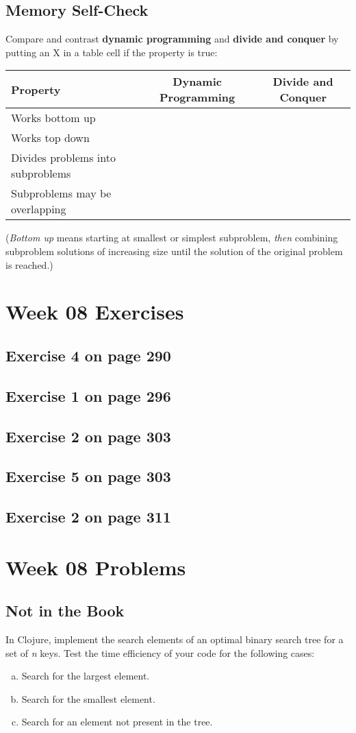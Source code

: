 \documentclass[12pt]{amsart}
\begin{document}
\subsection{Memory Self-Check}
Compare and contrast \textbf{dynamic programming} and \textbf{divide and conquer} by putting an X in a table cell if the property is true:
 
 \begin{tabular}{|l|c|c|}
 \hline
 Property&Dynamic Programming& Divide and Conquer\\
 \hline
 Works bottom up&&\\
 \hline
 Works top down&&\\
 \hline
 Divides problems into subproblems&&\\
 \hline
 Subproblems may be overlapping&&\\
 \hline
 \end{tabular}
(\textit{Bottom up} means starting at smallest or simplest subproblem, \textit{then} combining subproblem solutions of increasing size until the solution of the original problem is reached.)


 \section{Week 08 Exercises}
\subsection{ Exercise 4 on page 290} 
\subsection{ Exercise 1 on page 296} 
\subsection{Exercise 2 on page 303} 
\subsection{Exercise 5 on page 303} 
\subsection{Exercise 2 on page 311}


\section{Week 08 Problems}
\subsection{Not in the Book}
In Clojure, implement the search elements of an optimal binary search tree for a set of \textit{n} keys. Test the time efficiency of your code for the following cases:
\begin{enumerate}[(a)]
\item Search for the largest element.
\item Search for the smallest element.
\item Search for an element not present in the tree.
\end{enumerate}
\end{document}
